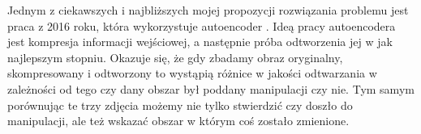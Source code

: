 Jednym z ciekawszych i najbliższych mojej propozycji rozwiązania problemu jest praca z 2016 roku, która wykorzystuje autoencoder \cite{auto}. Ideą pracy autoencodera jest kompresja informacji wejściowej, a następnie próba odtworzenia jej w jak najlepszym stopniu. Okazuje się, że gdy zbadamy obraz oryginalny, skompresowany i odtworzony to wystąpią różnice w jakości odtwarzania w zależności od tego czy dany obszar był poddany manipulacji czy nie. Tym samym porównując te trzy zdjęcia możemy nie tylko stwierdzić czy doszło do manipulacji, ale też wskazać obszar w którym coś zostało zmienione.
